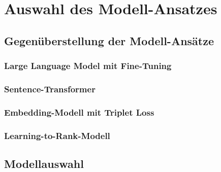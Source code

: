 ﻿\chapter{Auswahl des Modell-Ansatzes}\label{chap:auswahl_des_modellansatzes} 

\section{Gegenüberstellung der Modell-Ansätze}   

\subsection{Large Language Model mit Fine-Tuning}

\subsection{Sentence-Transformer}

\subsection{Embedding-Modell mit Triplet Loss}

\subsection{Learning-to-Rank-Modell}

\section{Modellauswahl}


